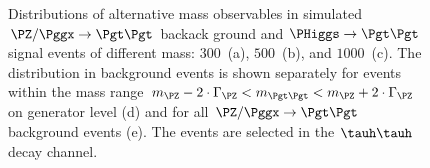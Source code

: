 {{{{{\begin{figure}
\begin{center}
\end{center}
\caption{
  Distributions of alternative mass observables in simulated $\PZ/\Pggx \to \Pgt\Pgt$ backack ground
  and $\PHiggs \to \Pgt\Pgt$ signal events of different mass:
  $300$~\GeV (a), $500$~\GeV (b), and $1000$~\GeV (c).
  The distribution in background events is shown separately for events within the
  mass range $m_{\PZ} - 2 \cdot \Gamma_{\PZ} < m_{\Pgt\Pgt} < m_{\PZ} + 2 \cdot \Gamma_{\PZ}$ on generator level (d)
  and for all $\PZ/\Pggx \to \Pgt\Pgt$ background events (e).
  The events are selected in the $\tauh\tauh$ decay channel.
}
\label{fig:massDistributions_mssm_tautau}
\end{figure}

}}}}}
